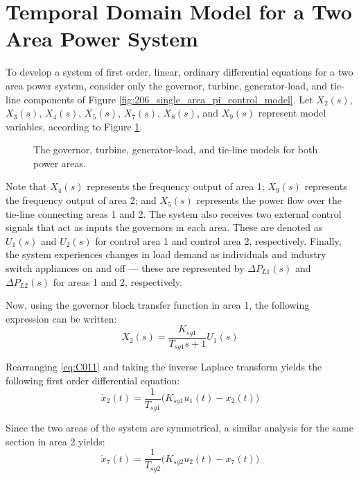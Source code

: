 \section{Temporal Domain Model for a Two Area Power System}

To develop a system of first order, linear, ordinary differential equations for a two area power system, consider only the governor, turbine, generator-load, and tie-line components of Figure \ref{fig:206_single_area_pi_control_model}. Let $X_2(s)$, $X_3(s)$, $X_4(s)$, $X_5(s)$, $X_7(s)$, $X_8(s)$, and $X_9(s)$ represent model variables, according to Figure \ref{fig:C101}.

\begin{figure}[h]
	\centering
	\resizebox{\textwidth}{!}{}
	\caption[Combined governor, turbine, generator-load, and tie-line for a two power area system]{The governor, turbine, generator-load, and tie-line models for both power areas.}
	\label{fig:C101}
\end{figure}

Note that $X_4(s)$ represents the frequency output of area 1; $X_9(s)$ represents the frequency output of area 2; and $X_5(s)$ represents the power flow over the tie-line connecting areas 1 and 2. The system also receives two external control signals that act as inputs the governors in each area. These are denoted as $U_1(s)$ and $U_2(s)$ for control area 1 and control area 2, respectively. Finally, the system experiences changes in load demand as individuals and industry switch appliances on and off --- these are represented by $\Delta P_{L1}(s)$ and $\Delta P_{L2}(s)$ for areas 1 and 2, respectively.

Now, using the governor block transfer function in area 1, the following expression can be written:
\begin{equation}
	X_2(s) = \frac{K_{sg1}}{T_{sg1}s + 1} U_1(s) \label{eq:C011}
\end{equation}

Rearranging \ref{eq:C011} and taking the inverse Laplace transform yields the following first order differential equation:
\begin{equation}
	\dot{x}_2(t) = \frac{1}{T_{sg1}}\big( K_{sg1} u_1(t) - x_2(t) \big) \label{eq:C012}
\end{equation}

Since the two areas of the system are symmetrical, a similar analysis for the same section in area 2 yields:
\begin{equation}
	\dot{x}_7(t) = \frac{1}{T_{sg2}}\big( K_{sg2} u_2(t) - x_7(t) \big) \label{eq:C013}
\end{equation}

